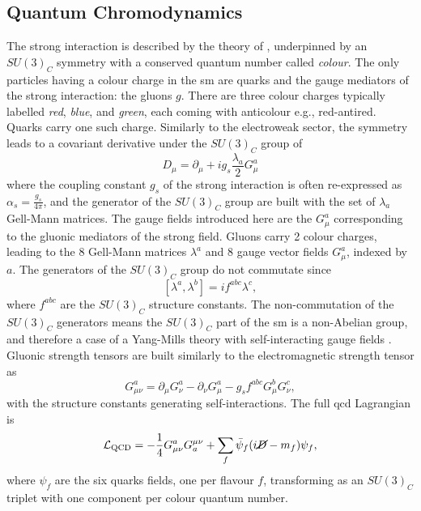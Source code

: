 \subsection{Quantum Chromodynamics}
The strong interaction is described by the theory of \textit{}, underpinned by an $SU(3)_C$ symmetry with a conserved quantum number called \textit{colour}. The only particles having a colour charge in the \gls{sm} are quarks and the gauge mediators of the strong interaction: the gluons $g$. There are three colour charges typically labelled \textit{red}, \textit{blue}, and \textit{green}, each coming with anticolour e.g., red-antired. Quarks carry one such charge. Similarly to the electroweak sector, the symmetry leads to a covariant derivative under the $SU(3)_C$ group of
\begin{equation}\label{eq-GaugeQCD}
    D_{\mu}  = \partial_{\mu} + ig_s \frac{\lambda_a}{2} G_{\mu}^a
\end{equation}
where the coupling constant $g_s$ of the strong interaction is often re-expressed as $\alpha_s = \frac{g_s}{4\pi}$, and the generator of the $SU(3)_C$ group are built with the set of $\lambda_a$ Gell-Mann matrices. The gauge fields introduced here are the $G_{\mu}^a$ corresponding to the gluonic mediators of the strong field. Gluons carry 2 colour charges, leading to the 8 Gell-Mann matrices $\lambda^a$ and 8 gauge vector fields $G_{\mu}^a$, indexed by $a$. The generators of the $SU(3)_C$ group do not commutate since \[ [\lambda^a, \lambda^b] = i f^{abc} \lambda^c,\] where $f^{abc}$ are the $SU(3)_C$ structure constants. The non-commutation of the $SU(3)_C$ generators means the $SU(3)_C$ part of the \gls{sm} is a non-Abelian group, and therefore a case of a Yang-Mills theory with self-interacting gauge fields \cite{PhysRev.96.191}. Gluonic strength tensors are built similarly to the electromagnetic strength tensor as \[G_{\mu\nu}^a = \partial_{\mu} G_{\nu}^a   - \partial_{\nu} G_{\mu}^a - g_s f^{abc} G_{\mu}^b G_{\nu}^c,\] with the structure constants generating self-interactions. The full \gls{qcd} Lagrangian is
\begin{equation}\label{eq-QCDLag}
    \mathcal{L}_{\text{QCD}} = -\frac{1}{4} G_{\mu\nu}^a G^{\mu\nu}_a + \sum_{f} \bar{\psi}_f (i \cancel{D} - m_f) \psi_f,
\end{equation}
where $\psi_f$ are the six quarks fields, one per flavour $f$, transforming as an $SU(3)_C$ triplet with one component per colour quantum number. \\

